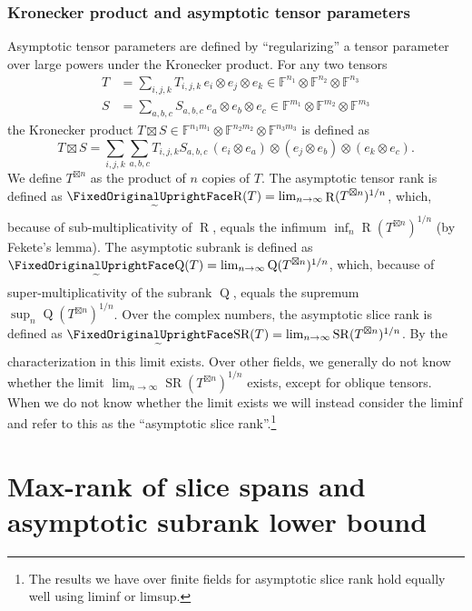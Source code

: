\documentclass[11pt]{article}
\makeatletter
\DeclareMathOperator{\subrank}{Q}
\DeclareMathOperator{\slicerank}{SR}
\DeclareMathOperator{\tensorrank}{R}
\newcommand{\FF}{\mathbb{F}}
\edef\FixedOriginalLowerTilde{\noexpand\mathchar\number\numexpr\symlargesymbols*256+101\relax}
\newcommand{\FixedQGlyphStyle}[2]{\begingroup\setbox0=\hbox{$\m@th#1\text{\normalfont\FixedOriginalUprightFace Q}$}\setbox2=\hbox{$\m@th#1\FixedOriginalLowerTilde$}\dimen0=\dp0\advance\dimen0 by\ht2\advance\dimen0 by1.23pt\typeout{FIXEDGLYPH Q STYLE\meaning#1 BASEwidth=\the\wd0 BASEheight=\the\ht0 BASEdepth=\the\dp0 TILDEwidth=\the\wd2 TILDEheight=\the\ht2 TILDEdepth=\the\dp2 LOWER=\the\dimen0}\hbox{\rlap{\hbox to\wd0{\hss\lower\dimen0\copy2\hss}}\box0}\endgroup}
\newcommand{\FixedRGlyphStyle}[2]{\begingroup\setbox0=\hbox{$\m@th#1\text{\normalfont\FixedOriginalUprightFace R}$}\setbox2=\hbox{$\m@th#1\FixedOriginalLowerTilde$}\dimen0=\dp0\advance\dimen0 by\ht2\advance\dimen0 by1.23pt\typeout{FIXEDGLYPH R STYLE\meaning#1 BASEwidth=\the\wd0 BASEheight=\the\ht0 BASEdepth=\the\dp0 TILDEwidth=\the\wd2 TILDEheight=\the\ht2 TILDEdepth=\the\dp2 LOWER=\the\dimen0}\hbox{\rlap{\hbox to\wd0{\hss\lower\dimen0\copy2\hss}}\box0}\endgroup}
\newcommand{\FixedSRGlyphStyle}[2]{\begingroup\setbox0=\hbox{$\m@th#1\text{\normalfont\FixedOriginalUprightFace SR}$}\setbox2=\hbox{$\m@th#1\FixedOriginalLowerTilde$}\dimen0=\dp0\advance\dimen0 by\ht2\advance\dimen0 by1.23pt\typeout{FIXEDGLYPH SR STYLE\meaning#1 BASEwidth=\the\wd0 BASEheight=\the\ht0 BASEdepth=\the\dp0 TILDEwidth=\the\wd2 TILDEheight=\the\ht2 TILDEdepth=\the\dp2 LOWER=\the\dimen0}\hbox{\rlap{\hbox to\wd0{\hss\lower\dimen0\copy2\hss}}\box0}\endgroup}
\DeclareMathOperator{\asympsubrank}{\mathpalette\FixedQGlyphStyle\relax}
\DeclareMathOperator{\asymprank}{\mathpalette\FixedRGlyphStyle\relax}
\DeclareMathOperator{\asympslicerank}{\mathpalette\FixedSRGlyphStyle\relax}
\makeatother
\begin{document}
\subsubsection*{Kronecker product and asymptotic tensor parameters}
%
Asymptotic tensor parameters are defined by ``regularizing'' a tensor parameter over large powers under the Kronecker product. For any two tensors 
\begin{align*}
T &= \sum_{i,j,k} T_{i,j,k}\, e_i \otimes e_j \otimes e_k \in \FF^{n_1} \otimes \FF^{n_2} \otimes \FF^{n_3}\\
S &= \sum_{a,b,c} S_{a,b,c} \, e_a\otimes e_b \otimes e_c \in \FF^{m_1} \otimes \FF^{m_2} \otimes \FF^{m_3}
\end{align*}
the Kronecker product $T \boxtimes S \in \FF^{n_1 m_1} \otimes \FF^{n_2 m_2} \otimes \FF^{n_3 m_3}$ is defined as
\[
T \boxtimes S = \sum_{i,j,k} \sum_{a,b,c} T_{i,j,k} S_{a,b,c}\, (e_i \otimes e_{a}) \otimes (e_j \otimes e_{b}) \otimes (e_k \otimes e_{c}).
\]
We define $T^{\boxtimes n}$ as the product of $n$ copies of $T$. The asymptotic tensor rank is defined as $\asymprank(T) = \lim_{n \to \infty} \tensorrank(T^{\boxtimes n})^{1/n}$, which, because of sub-multiplicativity of $\tensorrank$, equals the infimum $\inf_{n} \tensorrank(T^{\boxtimes n})^{1/n}$ (by Fekete's lemma). The asymptotic subrank is defined as $\asympsubrank(T) = \lim_{n \to \infty} \subrank(T^{\boxtimes n})^{1/n}$, which, because of super-multiplicativity of the subrank $\subrank$, equals the supremum $\sup_{n} \subrank(T^{\boxtimes n})^{1/n}$. Over the complex numbers, the asymptotic slice rank is defined as $\asympslicerank(T) = \lim_{n\to\infty} \slicerank(T^{\boxtimes n})^{1/n}$. By the characterization in \cite{MR4495838} this limit exists. Over other fields, we generally do not know whether the limit $\lim_{n\to\infty} \slicerank(T^{\boxtimes n})^{1/n}$ exists, except for oblique tensors. When we do not know whether the limit exists we will instead consider the liminf and refer to this as the ``asymptotic slice rank''.\footnote{The results we have over finite fields for asymptotic slice rank hold equally well using liminf or limsup.}

\setcounter{section}{1}
\section{Max-rank of slice spans and asymptotic subrank lower bound}\label{sec:max-rank}
\end{document}
